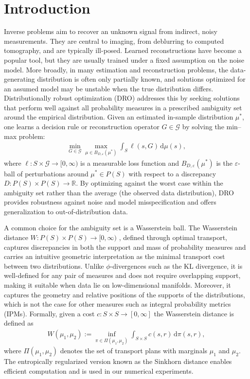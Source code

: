 \documentclass{article}
\newcommand{\R}{\mathbb{R}} %
\theoremstyle{definition}
\theoremstyle{remarksty}
\begin{document}
\section{Introduction}
Inverse problems aim to recover an unknown signal from indirect, noisy measurements. They are central to imaging, from deblurring to computed tomography, and are typically ill-posed. Learned reconstructions have become a popular tool, but they are usually trained under a fixed assumption on the noise model. More broadly, in many estimation and reconstruction problems, the data-generating distribution is often only partially known, and solutions optimized for an assumed model may be unstable when the true distribution differs. Distributionally robust optimization (DRO) addresses this by seeking solutions that perform well against all probability measures in a prescribed ambiguity set around the empirical distribution. Given an estimated in-sample distribution $\mu^*$, one learns a decision rule or reconstruction operator $G\in\mathcal{G}$ by solving the min–max problem:
\begin{align}\label{eq:DRO}
    \min_{G \in \mathcal{G}} \max_{\mu \in B_{D,\varepsilon} (\mu^*)}
    \int_S \ell(s,G)\,\mathrm{d}\mu(s),
\end{align}
where $\ell: S \times \mathcal{G} \to [0, \infty)$ is a measurable loss function and $B_{D,\varepsilon}(\mu^*)$ is the $\varepsilon$-ball of perturbations around $\mu^* \in P(S)$ with respect to a discrepancy $D: P(S) \times P(S) \to \R$. By optimizing against the worst case within the ambiguity set rather than the average (the observed data distribution), DRO provides robustness against noise and model misspecification and offers generalization to out-of-distribution data. 

A common choice for the ambiguity set is a Wasserstein ball. The Wasserstein distance $W: P(S)\times P(S)\to[0,\infty)$ \cite{villani_optimal_2009}, defined through optimal transport, captures discrepancies in both the support and mass of probability measures and carries an intuitive geometric interpretation as the minimal transport cost between two distributions. Unlike $\phi$-divergences such as the KL divergence, it is well-defined for any pair of measures and does not require overlapping support, making it suitable when data lie on low-dimensional manifolds. Moreover, it captures the geometry and relative positions of the supports of the distributions, which is not the case for other measures such as integral probability metrics (IPMs). Formally, given a cost $c: S \times S \to [0, \infty]$ the Wasserstein distance is defined as
\begin{align}\label{eq:w-dist}
    W(\mu_1, \mu_2) := \inf_{\pi \in \Pi(\mu_1, \mu_2)}
    \int_{S \times S} c(s, r)\,\mathrm{d}\pi(s,r),
\end{align}
where $\Pi(\mu_1, \mu_2)$ denotes the set of transport plans with marginals $\mu_1$ and $\mu_2$. The entropically regularized version known as the Sinkhorn distance \cite{peyre_computational_2019, cuturi_sinkhorn_2013} enables efficient computation and is used in our numerical experiments. 
\end{document}
